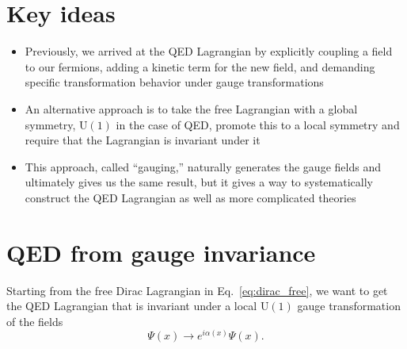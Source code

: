 \documentclass[12pt]{memoir}
\begin{document}
\section{Key ideas}

\begin{itemize}
  \item Previously, we arrived at the QED Lagrangian by explicitly coupling a field to our fermions,
    adding a kinetic term for the new field,
    and demanding specific transformation behavior under gauge transformations
  \item An alternative approach is to take the free Lagrangian with a global symmetry,
    $\text{U}(1)$ in the case of QED,
    promote this to a local symmetry and require that the Lagrangian is invariant under it
  \item This approach, called ``gauging,'' naturally generates the gauge fields and ultimately gives us the same result,
    but it gives a way to systematically construct the QED Lagrangian as well as more complicated theories
\end{itemize}

\section{QED from gauge invariance}

Starting from the free Dirac Lagrangian in Eq.~\ref{eq:dirac_free},
we want to get the QED Lagrangian
that is invariant under a local $\text{U}(1)$ gauge transformation of the fields
\begin{equation}
  \Psi(x) \rightarrow e^{i \alpha(x)}\Psi(x).
\end{equation}
\end{document}
